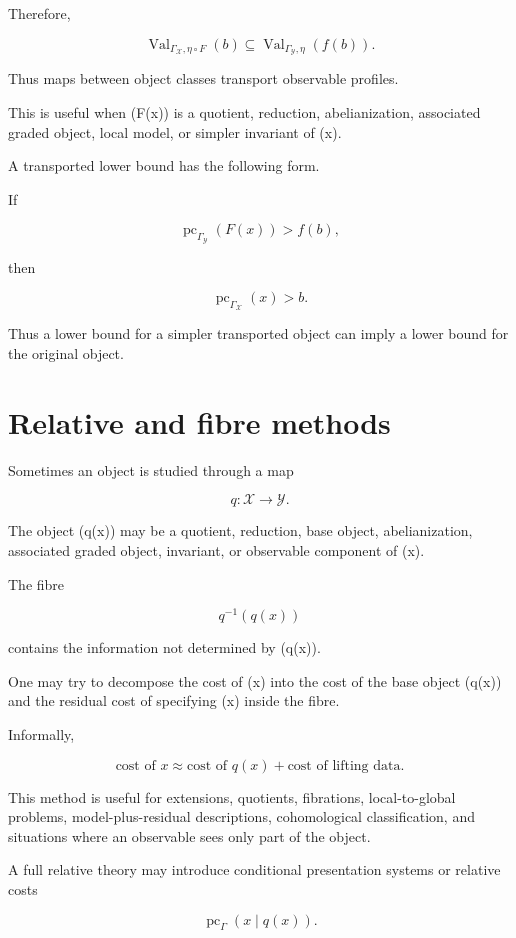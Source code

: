 \documentclass[11pt]{article}
\begin{document}
Therefore,

\[
\operatorname{Val}_{\Gamma_\mathcal X,\eta\circ F}(b)
\subseteq
\operatorname{Val}_{\Gamma_\mathcal Y,\eta}(f(b)).
\]

Thus maps between object classes transport observable profiles.

This is useful when (F(x)) is a quotient, reduction, abelianization, associated graded object, local model, or simpler invariant of (x).

A transported lower bound has the following form.

If

\[
\operatorname{pc}_{\Gamma_\mathcal Y}(F(x))> f(b),
\]

then

\[
\operatorname{pc}_{\Gamma_\mathcal X}(x)> b.
\]

Thus a lower bound for a simpler transported object can imply a lower bound for the original object.


\section{Relative and fibre methods}

Sometimes an object is studied through a map

\[
q:\mathcal X\to\mathcal Y.
\]

The object (q(x)) may be a quotient, reduction, base object, abelianization, associated graded object, invariant, or observable component of (x).

The fibre

\[
q^{-1}(q(x))
\]

contains the information not determined by (q(x)).

One may try to decompose the cost of (x) into the cost of the base object (q(x)) and the residual cost of specifying (x) inside the fibre.

Informally,

\[
\text{cost of }x
\approx
\text{cost of }q(x)
+
\text{cost of lifting data}.
\]

This method is useful for extensions, quotients, fibrations, local-to-global problems, model-plus-residual descriptions, cohomological classification, and situations where an observable sees only part of the object.

A full relative theory may introduce conditional presentation systems or relative costs

\[
\operatorname{pc}_\Gamma(x\mid q(x)).
\]
\end{document}
